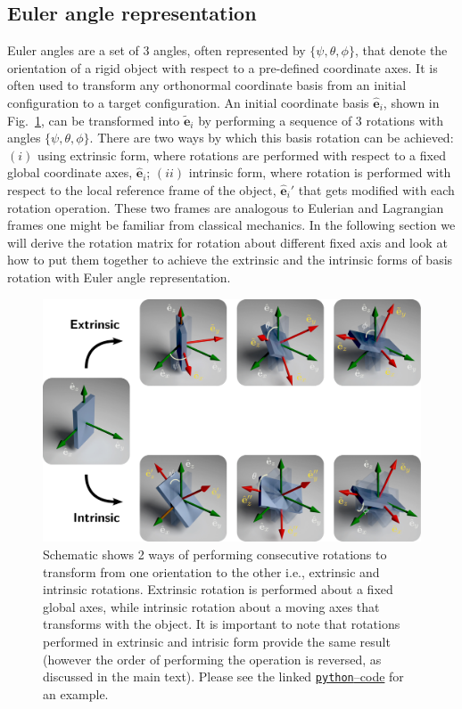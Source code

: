 \documentclass{article}
\def\eh{\hat{\mathbf{e}}}
\def\et{\tilde{\mathbf{e}}}
\begin{document}
\subsection{Euler angle representation}
Euler angles are a set of 3 angles, often represented by $\{\psi, \theta, \phi\}$, that denote the orientation of a rigid object with respect to a pre-defined coordinate axes. It is often used to transform any orthonormal coordinate basis from an initial configuration to a target configuration. An initial coordinate basis $\eh_i$, shown in Fig.~\ref{fig:eulAng3D}, can be transformed into $\et_i$ by performing a sequence of 3 rotations with angles $\{\psi, \theta, \phi\}$. There are two ways by which this basis rotation can be achieved: $(i)$ using extrinsic form, where rotations are performed with respect to a fixed global coordinate axes, $\eh_i$; $(ii)$ intrinsic form, where rotation is performed with respect to the local reference frame of the object, $\eh_i'$ that gets modified with each rotation operation. These two frames are analogous to Eulerian and Lagrangian frames one might be familiar from classical mechanics. In the following section we will derive the rotation matrix for rotation about different fixed axis and look at how to put them together to achieve the extrinsic and the intrinsic forms of basis rotation with Euler angle representation.

\begin{figure}[t!]
  \centering
  \includegraphics[width=\textwidth]{figs/figExtInt.jpg}
  \caption{Schematic shows 2 ways of performing consecutive rotations to transform from one orientation to the other i.e., extrinsic and intrinsic rotations. Extrinsic rotation is performed about a fixed global axes, while intrinsic rotation about a moving axes that transforms with the object. It is important to note that rotations performed in extrinsic and intrisic form provide the same result (however the order of performing the operation is reversed, as discussed in the main text). Please see the linked \href{https://github.com/sgangaprasath/RotationTut/blob/main/Rotations.ipynb}{\texttt{python}--code} for an example.}
  \label{fig:eulAng3D}
\end{figure}
\end{document}
